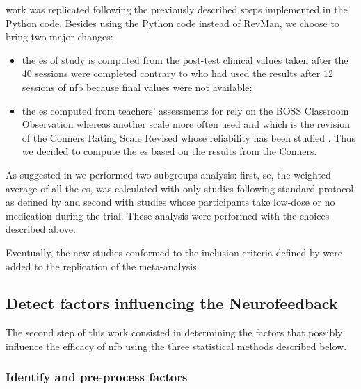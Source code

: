 \citeauthor{Cortese2016} work was replicated following the previously described steps implemented in the Python code. Besides using the Python 
code instead of RevMan, we choose to bring two major changes:
\begin{itemize}
\item the \gls{es} of \citeauthor{Arnold2014} study is computed from the post-test clinical values taken after the 40 sessions were completed 
contrary to \citet{Cortese2016} who had used the results after 12 sessions of \gls{nfb} because final values were not available;
\item the \gls{es} computed from teachers' assessments for \citet{Steiner2014} rely on the BOSS Classroom Observation \citep{Shapiro2010} whereas 
another scale more often used \citep{Christiansen2014, Bluschke2016} and which is the revision of the Conners Rating Scale Revised \citep{Conners1998} 
whose reliability has been studied \citep{Collett2003}. Thus we decided to compute the \gls{es} based on the results from the Conners.  
\end{itemize} 

As suggested in \citet{Cortese2016} we performed two subgroups analysis: first, \gls{se}, the weighted average of all the \gls{es}, was calculated with only studies following 
standard protocol as defined by \citet{Arns2014} and second with studies whose participants take low-dose or no medication during the trial. 
These analysis were performed with the choices described above. 

Eventually, the new studies conformed to the inclusion criteria defined by \citeauthor{Cortese2016} were added to the replication of the meta-analysis. 

\subsection{Detect factors influencing the Neurofeedback}

The second step of this work consisted in determining the factors that possibly influence the efficacy of \gls{nfb} using the three statistical
 methods described below. 

\subsubsection{Identify and pre-process factors}

